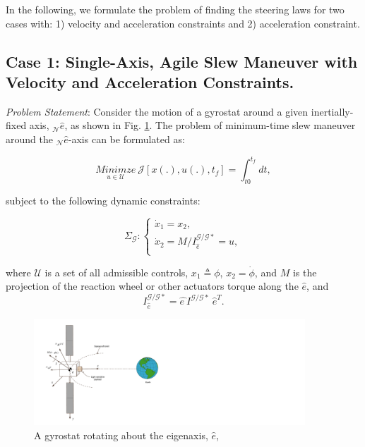 \documentclass[letterpaper, paper,12pt]{AAS}		%
\begin{document}
	In the following, we formulate the problem of finding the steering laws for two cases with: 1) velocity and acceleration constraints and 2) acceleration constraint.
	\subsection{Case 1: Single-Axis, Agile Slew Maneuver with Velocity and Acceleration Constraints.}	 
	

	{\it Problem Statement}: Consider the motion of a gyrostat around a given inertially-fixed axis, $_\mathcal{N}\hat{e}$, as shown in Fig. \ref{s/c}. The problem of minimum-time slew maneuver around the $_\mathcal{N}\hat{e}$-axis can be formulated as:
	
	\begin{equation}\label{costfunction}
	\underset{u\in \mathcal{U}}{Minimze}\ \mathcal{J}[x(.), u(.), t_f]=\int_{t0}^{t_f} dt,
	\end{equation}
	
	subject to the following dynamic constraints:
	
	\begin{equation}\label{system}
	\Sigma_\mathcal{G}:\left\{
	\begin{array}{l}
	\dot{x}_1=x_2, \\
	\dot{x}_2=M/I_{\hat{e}}^{\mathcal{G/G*}}=u, \\
	\end{array}
	\right.
	\end{equation}
	
	where $\mathcal{U}$ is a set of all admissible controls, $x_1 \triangleq\phi$, $x_2=\dot{\phi}$, and $M$ is the projection of the reaction wheel or other actuators torque along the $\hat{e}$, and 
	\begin{equation}
	I_{\hat{e}}^{\mathcal{G/G*}}=\hat{e\ }I^{\mathcal{G/G*}}\ \hat{e}^T.
	\end{equation}
	
	\begin{figure}[H]
		\begin{center}
			\includegraphics[width=4in]{./Figures/Spacecraft_earth}  
			\caption{A gyrostat rotating about the eigenaxis, $\hat{e}$,}
			\label{s/c}
		\end{center}    
	\end{figure}
	
\end{document}
